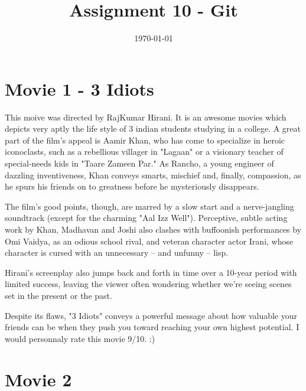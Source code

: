 \documentclass[]{article}
\title{Assignment 10 - Git}
\date{\today}
\begin{document}
\maketitle
\section{Movie 1 - 3 Idiots}
This moive was directed by RajKumar Hirani. It is an awesome movies which depicts very aptly the life style of 3 indian students studying in a college.
A great part of the film's appeal is Aamir Khan, who has come to specialize in heroic iconoclasts, such as a rebellious villager in "Lagaan" or a visionary teacher of special-needs kids in "Taare Zameen Par." As Rancho, a young engineer of dazzling inventiveness, Khan conveys smarts, mischief and, finally, compassion, as he spurs his friends on to greatness before he mysteriously disappears.

The film's good points, though, are marred by a slow start and a nerve-jangling soundtrack (except for the charming "Aal Izz Well"). Perceptive, subtle acting work by Khan, Madhavan and Joshi also clashes with buffoonish performances by Omi Vaidya, as an odious school rival, and veteran character actor Irani, whose character is cursed with an unnecessary -- and unfunny -- lisp.

Hirani's screenplay also jumps back and forth in time over a 10-year period with limited success, leaving the viewer often wondering whether we're seeing scenes set in the present or the past.

Despite its flaws, "3 Idiots" conveys a powerful message about how valuable your friends can be when they push you toward reaching your own highest potential.
I would personnaly rate this movie 9/10. :)

\section{Movie 2}
\end{document}
